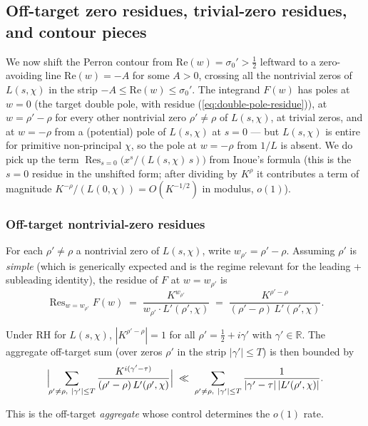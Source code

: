\subsection{Off-target zero residues, trivial-zero residues, and contour pieces}

We now shift the Perron contour from \(\mathrm{Re}(w) = \sigma_0' > \tfrac12\)
leftward to a zero-avoiding line \(\mathrm{Re}(w) = -A\) for some \(A > 0\),
crossing all the nontrivial zeros of \(L(s, \chi)\) in the strip
\(-A \le \mathrm{Re}(w) \le \sigma_0'\). The integrand \(F(w)\) has poles
at \(w = 0\) (the target double pole, with residue
(\ref{eq:double-pole-residue})), at \(w = \rho' - \rho\) for every
other nontrivial zero \(\rho' \ne \rho\) of \(L(s, \chi)\), at trivial
zeros, and at \(w = -\rho\) from a (potential) pole of \(L(s, \chi)\) at
\(s = 0\) --- but \(L(s, \chi)\) is entire for primitive non-principal
\(\chi\), so the pole at \(w = -\rho\) from \(1/L\) is absent. We do pick
up the term \(\mathop{\mathrm{Res}}_{s = 0}\bigl(x^s/(L(s,\chi)\,s)\bigr)\) from Inoue's formula
(this is the \(s = 0\) residue in the unshifted form; after dividing by
\(K^\rho\) it contributes a term of magnitude \(K^{-\rho}/(L(0,\chi)) =
O(K^{-1/2})\) in modulus, \(o(1)\)).

\subsubsection{Off-target nontrivial-zero residues}

For each \(\rho' \ne \rho\) a nontrivial zero of \(L(s, \chi)\), write
\(w_{\rho'} = \rho' - \rho\). Assuming \(\rho'\) is \emph{simple} (which is
generically expected and is the regime relevant for the leading +
subleading identity), the residue of \(F\) at \(w = w_{\rho'}\) is
\[
\mathop{\mathrm{Res}}_{w = w_{\rho'}} F(w)
\;=\;
\frac{K^{w_{\rho'}}}{w_{\rho'} \cdot L'(\rho', \chi)}
\;=\;
\frac{K^{\rho' - \rho}}{(\rho' - \rho)\,L'(\rho', \chi)}.
\]

Under RH for \(L(s, \chi)\), \(|K^{\rho' - \rho}| = 1\) for all
\(\rho' = \tfrac12 + i\gamma'\) with \(\gamma' \in \mathbb{R}\). The
aggregate off-target sum (over zeros \(\rho'\) in the strip
\(|\gamma'| \le T\)) is then bounded by
\[
\Bigl|\!\sum_{\rho' \ne \rho,\ |\gamma'| \le T}
\frac{K^{i(\gamma' - \tau)}}{(\rho' - \rho)\,L'(\rho', \chi)}\Bigr|
\;\ll\;
\sum_{\rho' \ne \rho,\ |\gamma'| \le T}
\frac{1}{|\gamma' - \tau|\,|L'(\rho', \chi)|}.
\]

This is the off-target \emph{aggregate} whose control determines the
\(o(1)\) rate.

